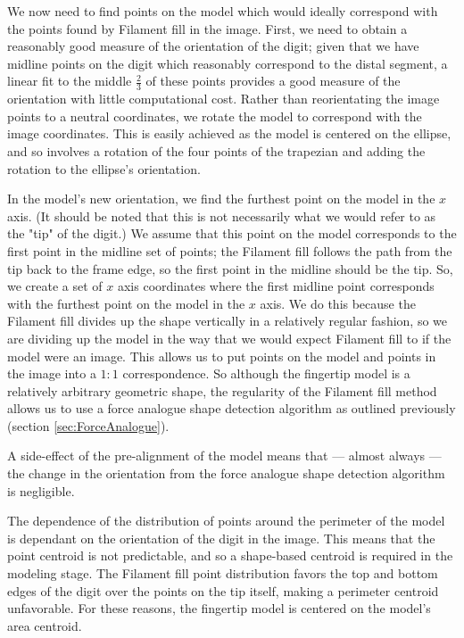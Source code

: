 We now need to find points on the model which would ideally correspond with the points found by Filament fill in the image. First, we need to obtain a reasonably good measure of the orientation of the digit; given that we have midline points on the digit which reasonably correspond to the distal segment, a linear fit to the middle $\frac{2}{3}$ of these points provides a good measure of the orientation with little computational cost. Rather than reorientating the image points to a neutral coordinates, we rotate the model to correspond with the image coordinates. This is easily achieved as the model is centered on the ellipse, and so involves a rotation of the four points of the trapezian and adding the rotation to the ellipse's orientation.

In the model's new orientation, we find the furthest point on the model in the $x$ axis. (It should be noted that this is not necessarily what we would refer to as the "tip" of the digit.) We assume that this point on the model corresponds to the first point in the midline set of points; the Filament fill follows the path from the tip back to the frame edge, so the first point in the midline should be the tip. So, we create a set of $x$ axis coordinates where the first midline point corresponds with the furthest point on the model in the $x$ axis. We do this because the Filament fill divides up the shape vertically in a relatively regular fashion, so we are dividing up the model in the way that we would expect Filament fill to if the model were an image. This allows us to put points on the model and points in the image into a $1:1$ correspondence. So although the fingertip model is a relatively arbitrary geometric shape, the regularity of the Filament fill method allows us to use a force analogue shape detection algorithm as outlined previously (section \ref{sec:ForceAnalogue}).

A side-effect of the pre-alignment of the model means that --- almost always --- the change in the orientation from the force analogue shape detection algorithm is negligible.

The dependence of the distribution of points around the perimeter of the model is dependant on the orientation of the digit in the image. This means that the point centroid is not predictable, and so a shape-based centroid is required in the modeling stage. The Filament fill point distribution favors the top and bottom edges of the digit over the points on the tip itself, making a perimeter centroid unfavorable. For these reasons, the fingertip model is centered on the model's area centroid.

